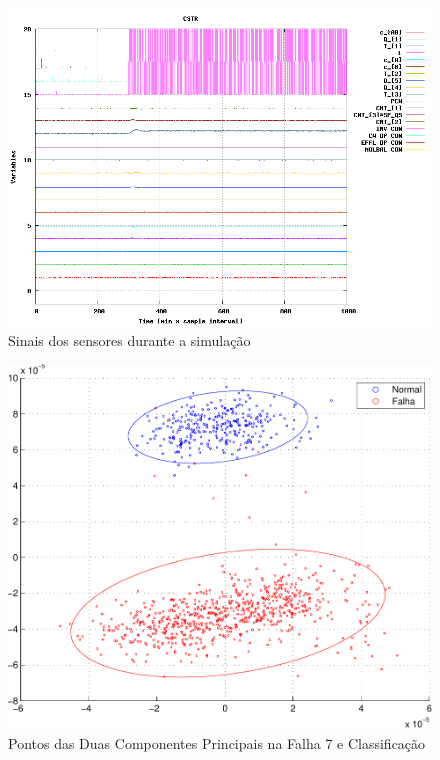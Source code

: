 \documentclass[journal]{IEEEtran}
\begin{document}
\begin{figure}[H]
	\centering
  	\includegraphics[scale=0.5]{figs/fault7/sinal_falha_7.png}
  	\caption{Sinais dos sensores durante a simulação}
	\label{fig:f7:s}
\end{figure}

\begin{figure}[H]
	\centering
  \includegraphics[scale=0.6]{figs/fault7/pontos2D.pdf}
  \caption{Pontos das Duas Componentes Principais na Falha 7 e Classificação}
	\label{fig:f7:2d}
\end{figure}
\end{document}
